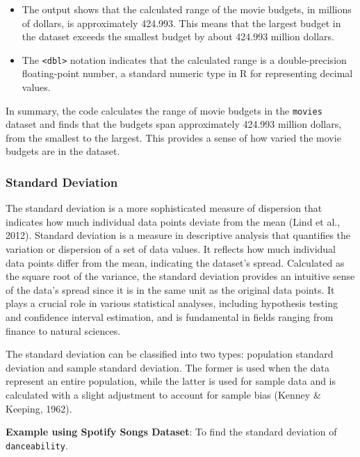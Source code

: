 \documentclass[
]{book}
\providecommand{\tightlist}{%
  \setlength{\itemsep}{0pt}\setlength{\parskip}{0pt}}
\begin{document}
\begin{itemize}
\tightlist
\item
  The output shows that the calculated range of the movie budgets, in millions of dollars, is approximately 424.993. This means that the largest budget in the dataset exceeds the smallest budget by about 424.993 million dollars.
\item
  The \texttt{\textless{}dbl\textgreater{}} notation indicates that the calculated range is a double-precision floating-point number, a standard numeric type in R for representing decimal values.
\end{itemize}

In summary, the code calculates the range of movie budgets in the \texttt{movies} dataset and finds that the budgets span approximately 424.993 million dollars, from the smallest to the largest. This provides a sense of how varied the movie budgets are in the dataset.

\hypertarget{standard-deviation}{%
\subsubsection*{Standard Deviation}\label{standard-deviation}}

The standard deviation is a more sophisticated measure of dispersion that indicates how much individual data points deviate from the mean (Lind et al., 2012). Standard deviation is a measure in descriptive analysis that quantifies the variation or dispersion of a set of data values. It reflects how much individual data points differ from the mean, indicating the dataset's spread. Calculated as the square root of the variance, the standard deviation provides an intuitive sense of the data's spread since it is in the same unit as the original data points. It plays a crucial role in various statistical analyses, including hypothesis testing and confidence interval estimation, and is fundamental in fields ranging from finance to natural sciences.

The standard deviation can be classified into two types: population standard deviation and sample standard deviation. The former is used when the data represent an entire population, while the latter is used for sample data and is calculated with a slight adjustment to account for sample bias (Kenney \& Keeping, 1962).

\textbf{Example using Spotify Songs Dataset}: To find the standard deviation of \texttt{danceability}.
\end{document}
